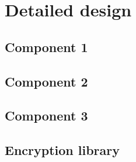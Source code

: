\section{Detailed design}

\subsection{Component 1}
\subsection{Component 2}
\subsection{Component 3}
\subsection{Encryption library}
